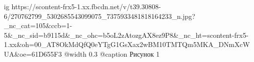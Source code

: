  
 
 
 
 

\ifcmt
  ig https://scontent-frx5-1.xx.fbcdn.net/v/t39.30808-6/270762799_5302685543099075_7375933481818164233_n.jpg?_nc_cat=105&ccb=1-5&_nc_sid=b9115d&_nc_ohc=b5oL2zAtozgAX8ez9P8&_nc_ht=scontent-frx5-1.xx&oh=00_AT8OkMdQfQ0eYTgG1GsXax2wBM10TMTQm5MKA_DNmXcWUA&oe=61D655F3
  @width 0.3
	@caption Рисунок 1
\fi

